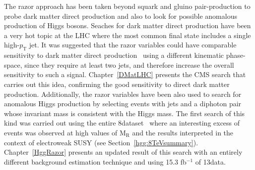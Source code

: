 The razor approach has been taken beyond squark and gluino
pair-production to probe dark matter direct production and also
to look for possible anomalous production of Higgs bosons. Seaches for dark matter direct
production have been a very hot topic at the LHC where the most common
final state includes a single high-$p_{\mathrm{T}}$  jet. It was
suggested that the razor variables could have comparable sensitivity
to dark matter direct production~\cite{Fox:2012ee} using a different kinematic
phase-space, since they require at least two jets, and therefore
increase the overall sensitivity to such a signal. Chapter~\ref{DMatLHC}
presents the CMS search that carries out this idea, confirming the
good sensitivity to direct dark matter production. Additionally, the razor
variables have been also used to search for anomalous Higgs production
by selecting events with jets and a diphoton pair whose invariant mass
is consistent with the Higgs mass. The first search of this kind was
carried out using the entire 8\TeV dataset~\cite{SUS-14-017} where an interesting excess
of events was observed at high values of $\mathrm{M_{R}}$ and the
results interpreted in the context of electroweak SUSY (see Section~\ref{hgg:8TeVsummary}). Chapter~\ref{HggRazor}
presents an updated result of this search with an entirely different
background estimation technique and using 15.3 fb$^{-1}$ of 13\TeV data.
